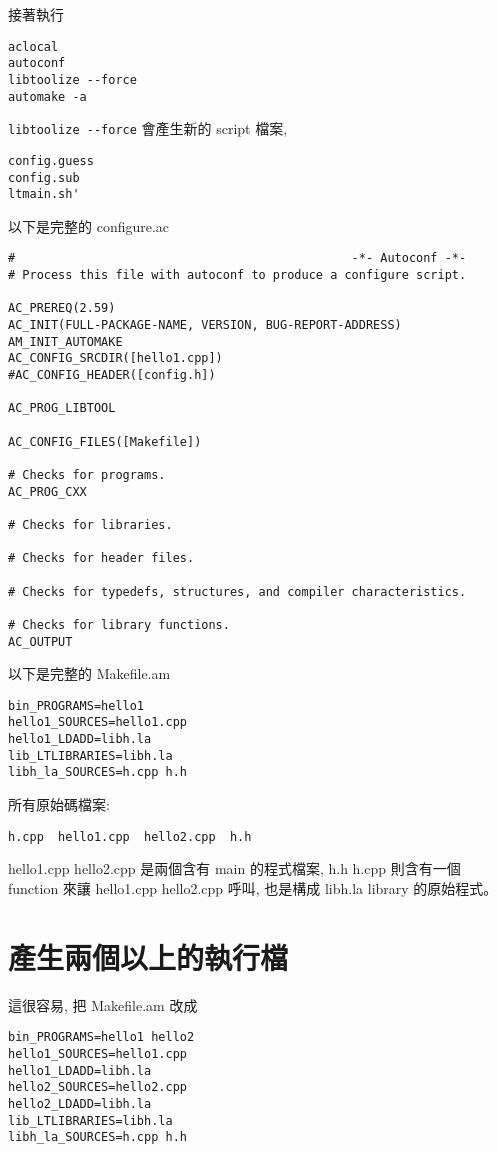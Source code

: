 \documentclass[12pt,a4]{article}
\begin{document}
\begin{CJK}{UTF8}{cwmu}
接著執行
\begin{verbatim}
aclocal
autoconf
libtoolize --force 
automake -a
\end{verbatim}

\verb+libtoolize --force+ 會產生新的 script 檔案,
\begin{verbatim}
config.guess
config.sub
ltmain.sh'
\end{verbatim}

以下是完整的 configure.ac
\begin{verbatim}
#                                               -*- Autoconf -*-
# Process this file with autoconf to produce a configure script.

AC_PREREQ(2.59)
AC_INIT(FULL-PACKAGE-NAME, VERSION, BUG-REPORT-ADDRESS)
AM_INIT_AUTOMAKE
AC_CONFIG_SRCDIR([hello1.cpp])
#AC_CONFIG_HEADER([config.h])

AC_PROG_LIBTOOL

AC_CONFIG_FILES([Makefile])

# Checks for programs.
AC_PROG_CXX

# Checks for libraries.

# Checks for header files.

# Checks for typedefs, structures, and compiler characteristics.

# Checks for library functions.
AC_OUTPUT
\end{verbatim}

以下是完整的 Makefile.am
\begin{verbatim}
bin_PROGRAMS=hello1
hello1_SOURCES=hello1.cpp 
hello1_LDADD=libh.la
lib_LTLIBRARIES=libh.la 
libh_la_SOURCES=h.cpp h.h
\end{verbatim}

所有原始碼檔案:
\begin{verbatim}
h.cpp  hello1.cpp  hello2.cpp  h.h
\end{verbatim}

hello1.cpp hello2.cpp 是兩個含有 main 的程式檔案,
h.h h.cpp 則含有一個 function 來讓 hello1.cpp hello2.cpp 呼叫,
也是構成 libh.la library 的原始程式。

\section{產生兩個以上的執行檔}
這很容易,
把 Makefile.am 改成

\begin{verbatim}
bin_PROGRAMS=hello1 hello2
hello1_SOURCES=hello1.cpp 
hello1_LDADD=libh.la
hello2_SOURCES=hello2.cpp 
hello2_LDADD=libh.la
lib_LTLIBRARIES=libh.la 
libh_la_SOURCES=h.cpp h.h
\end{verbatim}


\end{CJK}
\end{document}
